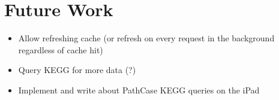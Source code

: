 \section{Future Work}
\label{sect:kegg_future_work}

\begin{itemize}

    \item Allow refreshing cache (or refresh on every request in the background
    regardless of cache hit)

    \item Query KEGG for more data (?)

    \item Implement and write about PathCase KEGG queries on the iPad

\end{itemize}
